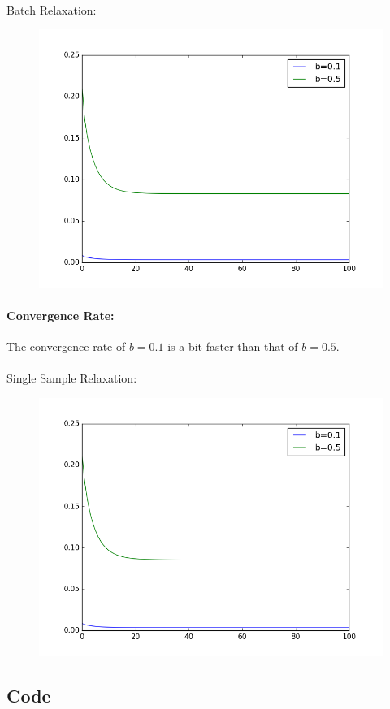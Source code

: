 \documentclass[]{article}
\begin{document}
    \paragraph{}Batch Relaxation:
    \begin{figure}[H]
        \centering
        \includegraphics[scale=0.5]{3_batch.png}
    \end{figure}
    \paragraph{Convergence Rate:} The convergence rate of $b=0.1$ is a bit faster than that of $b=0.5$.
    \paragraph{}Single Sample Relaxation:
    \begin{figure}[H]
        \centering
        \includegraphics[scale=0.5]{3_single.png}
    \end{figure}
    \subsection{Code}
    
\end{document}
